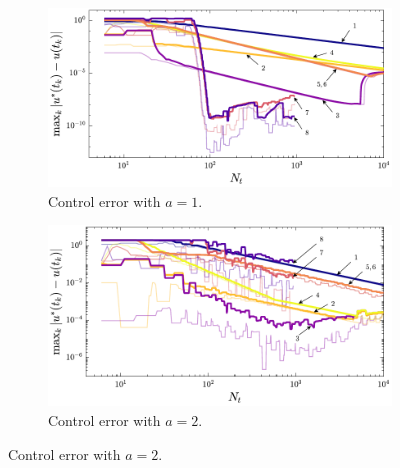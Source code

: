 \begin{figure}
\begin{subfigure}{0.5\textwidth}
\centering
\includegraphics[width=\textwidth]{../ch5/figures/ex3_sens_control_a1}%
\caption{Control error with $a=1$.}
\label{fig:ch5:ex3sens:control:a1}
\end{subfigure}%
\begin{subfigure}{0.5\textwidth}
\centering
\includegraphics[width=\textwidth]{../ch5/figures/ex3_sens_control_a2}%
\caption{Control error with $a=2$.}
\label{fig:ch5:ex3sens:control:a2}
\end{subfigure}%


\end{figure}
